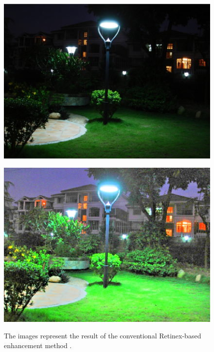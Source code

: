\begin{figure}
\begin{minipage}[b]{0.5\hsize}
		\centering
		\includegraphics[height=0.6\hsize]{images/msr/input.eps}
		 \label{fig:msr/input}
	\end{minipage}
	\begin{minipage}[b]{0.5\hsize}
		\centering
		\includegraphics[height=0.6\hsize]{images/msr/reflectance.eps}
		 \label{fig:msr/reflectance}
	\end{minipage}
\caption{The images represent the result of the conventional Retinex-based enhancement method \cite{msr}.}
\label{fig:msr}
\end{figure}

